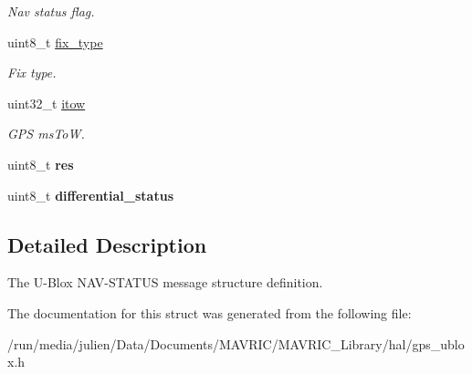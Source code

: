 \begin{DoxyCompactItemize}
\begin{DoxyCompactList}\small\item\em Nav status flag. \end{DoxyCompactList}\item 
\hypertarget{structubx__nav__status__t_a8b69335e24211f48829154c4a96a279e}{uint8\+\_\+t \hyperlink{structubx__nav__status__t_a8b69335e24211f48829154c4a96a279e}{fix\+\_\+type}}\label{structubx__nav__status__t_a8b69335e24211f48829154c4a96a279e}

\begin{DoxyCompactList}\small\item\em Fix type. \end{DoxyCompactList}\item 
\hypertarget{structubx__nav__status__t_aa4d4659af6bb196093380bb742793ef7}{uint32\+\_\+t \hyperlink{structubx__nav__status__t_aa4d4659af6bb196093380bb742793ef7}{itow}}\label{structubx__nav__status__t_aa4d4659af6bb196093380bb742793ef7}

\begin{DoxyCompactList}\small\item\em G\+P\+S ms\+To\+W. \end{DoxyCompactList}\item 
\hypertarget{structubx__nav__status__t_ac0d81baf2eb8a54c1ede0613445d7699}{uint8\+\_\+t {\bfseries res}}\label{structubx__nav__status__t_ac0d81baf2eb8a54c1ede0613445d7699}

\item 
\hypertarget{structubx__nav__status__t_ac8275d91239f26d1d97dbc9abeef336d}{uint8\+\_\+t {\bfseries differential\+\_\+status}}\label{structubx__nav__status__t_ac8275d91239f26d1d97dbc9abeef336d}

\end{DoxyCompactItemize}


\subsection{Detailed Description}
The U-\/\+Blox N\+A\+V-\/\+S\+T\+A\+T\+U\+S message structure definition. 

The documentation for this struct was generated from the following file\+:\begin{DoxyCompactItemize}
\item 
/run/media/julien/\+Data/\+Documents/\+M\+A\+V\+R\+I\+C/\+M\+A\+V\+R\+I\+C\+\_\+\+Library/hal/gps\+\_\+ublox.\+h\end{DoxyCompactItemize}
